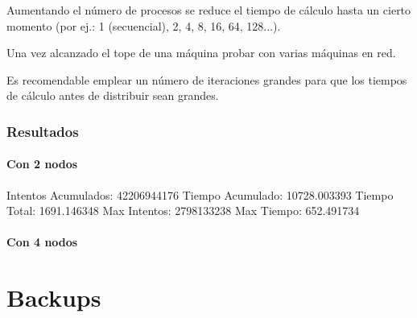 \documentclass{article}
\begin{document}
	Aumentando el número de procesos se reduce el tiempo de cálculo hasta un cierto momento (por ej.: 1 (secuencial), 2, 4, 8, 16, 64, 128...). 

	Una vez alcanzado el tope de una máquina probar con varias máquinas en red. 

	Es recomendable emplear un número de iteraciones grandes para que los tiempos de cálculo antes de distribuir sean grandes.

\subsubsection{Resultados}

\paragraph{Con 2 nodos}

Intentos Acumulados: 42206944176 
Tiempo Acumulado:    10728.003393   
Tiempo Total:        1691.146348   
Max Intentos:        2798133238 
Max Tiempo:          652.491734

\paragraph{Con 4 nodos}

\section{Backups}
\end{document}
